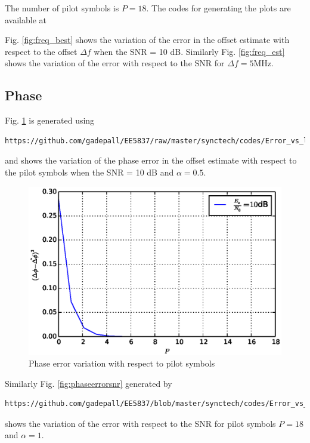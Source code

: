 \documentclass[journal,12pt,twocolumn]{IEEEtran}
\begin{document}
%
The number of pilot symbols is $P = 18$. The codes for generating the plots are available at

Fig. \ref{fig:freq_best} shows the variation of the error in the offset estimate with respect to the offset 
$\Delta f$ when the SNR = 10 dB.  Similarly Fig. \ref{fig:freq_est} shows the variation of the error with 
respect 
to the SNR for $\Delta f = 5 $MHz.
\subsection{Phase}
Fig. \ref{fig:phaseerrorp} is generated using 
\begin{lstlisting}
https://github.com/gadepall/EE5837/raw/master/synctech/codes/Error_vs_lp.py
\end{lstlisting}
and  shows the variation of the phase error in the offset estimate with respect to the pilot symbols  when the 
SNR = 10 dB and $\alpha = 0.5$.

\begin{figure}[!ht]
\begin{center}
\includegraphics[width=\columnwidth]{./figs/Phase_error_with_respect_to_pilots.eps}
\end{center}
\caption{Phase error variation with respect to pilot symbols }
\label{fig:phaseerrorp}
\end{figure}
%
Similarly Fig. \ref{fig:phaseerrorsnr} generated by 
\begin{lstlisting}
https://github.com/gadepall/EE5837/blob/master/synctech/codes/Error_vs_snr.py
\end{lstlisting}
shows the variation of the error with 
respect 
to the SNR for pilot symbols $P = 18$ and  $\alpha = 1$.
\end{document}

